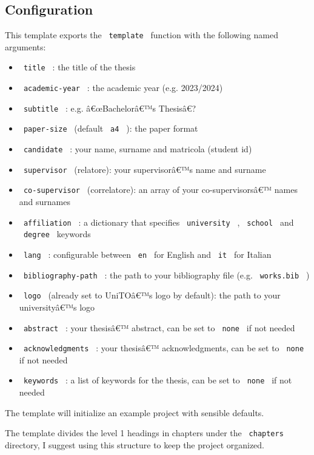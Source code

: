 \subsection{Configuration}\label{configuration}

This template exports the \texttt{\ template\ } function with the
following named arguments:

\begin{itemize}
\tightlist
\item
  \texttt{\ title\ } : the title of the thesis
\item
  \texttt{\ academic-year\ } : the academic year (e.g. 2023/2024)
\item
  \texttt{\ subtitle\ } : e.g. â€œBachelorâ€™s Thesisâ€?
\item
  \texttt{\ paper-size\ } (default \texttt{\ a4\ } ): the paper format
\item
  \texttt{\ candidate\ } : your name, surname and matricola (student id)
\item
  \texttt{\ supervisor\ } (relatore): your supervisorâ€™s name and
  surname
\item
  \texttt{\ co-supervisor\ } (correlatore): an array of your
  co-supervisorsâ€™ names and surnames
\item
  \texttt{\ affiliation\ } : a dictionary that specifies
  \texttt{\ university\ } , \texttt{\ school\ } and \texttt{\ degree\ }
  keywords
\item
  \texttt{\ lang\ } : configurable between \texttt{\ en\ } for English
  and \texttt{\ it\ } for Italian
\item
  \texttt{\ bibliography-path\ } : the path to your bibliography file
  (e.g. \texttt{\ works.bib\ } )
\item
  \texttt{\ logo\ } (already set to UniTOâ€™s logo by default): the path
  to your universityâ€™s logo
\item
  \texttt{\ abstract\ } : your thesisâ€™ abstract, can be set to
  \texttt{\ none\ } if not needed
\item
  \texttt{\ acknowledgments\ } : your thesisâ€™ acknowledgments, can be
  set to \texttt{\ none\ } if not needed
\item
  \texttt{\ keywords\ } : a list of keywords for the thesis, can be set
  to \texttt{\ none\ } if not needed
\end{itemize}

The template will initialize an example project with sensible defaults.

The template divides the level 1 headings in chapters under the
\texttt{\ chapters\ } directory, I suggest using this structure to keep
the project organized.

